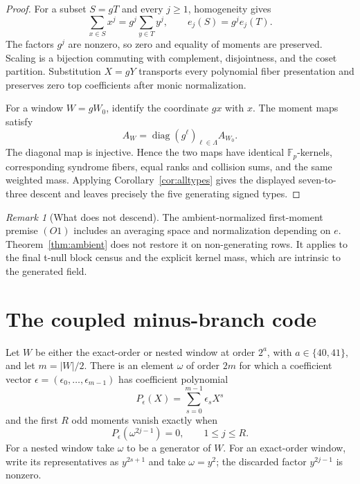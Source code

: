 \documentclass[11pt,a4paper]{amsart}
\theoremstyle{remark}
\newtheorem{remark}[theorem]{Remark}
\newcommand{\F}{\mathbb F}
\begin{document}
\begin{proof}
For a subset \(S=gT\) and every \(j\ge1\), homogeneity gives
\[
 \sum_{x\in S}x^j=g^j\sum_{y\in T}y^j,
 \qquad e_j(S)=g^je_j(T).                             \tag{2.1}
\]
The factors \(g^j\) are nonzero, so zero and equality of moments are
preserved.  Scaling is a bijection commuting with complement, disjointness,
and the coset partition.  Substitution \(X=gY\) transports every polynomial
fiber presentation and preserves zero top coefficients after monic
normalization.

For a window \(W=gW_0\), identify the coordinate \(gx\) with \(x\).  The
moment maps satisfy
\[
 A_W=\operatorname{diag}(g^\ell)_{\ell\in\Lambda}A_{W_0}. \tag{2.2}
\]
The diagonal map is injective.  Hence the two maps have identical
\(\F_p\)-kernels, corresponding syndrome fibers, equal ranks and collision
sums, and the same weighted mass.  Applying
Corollary~\ref{cor:alltypes} gives the displayed seven-to-three descent and
leaves precisely the five generating signed types.
\end{proof}

\begin{remark}[What does not descend]
The ambient-normalized first-moment premise \((O1)\) includes an averaging
space and normalization depending on \(e\).  Theorem~\ref{thm:ambient} does
not restore it on non-generating rows.  It applies to the final t-null block
census and the explicit kernel mass, which are intrinsic to the generated
field.
\end{remark}

\section{The coupled minus-branch code}

Let $W$ be either the exact-order or nested window at order $2^a$, with
$a\in\{40,41\}$, and let $m=|W|/2$.  There is an element $\omega$ of order
$2m$ for which a coefficient vector
$\epsilon=(\epsilon_0,\ldots,\epsilon_{m-1})$ has coefficient polynomial
\[
 P_\epsilon(X)=\sum_{s=0}^{m-1}\epsilon_sX^s
\]
and the first $R$ odd moments vanish exactly when
\[
 P_\epsilon(\omega^{2j-1})=0,
 \qquad 1\le j\le R.                                  \tag{3.1}
\]
For a nested window take $\omega$ to be a generator of $W$.  For an
exact-order window, write its representatives as
$y^{2s+1}$ and take $\omega=y^2$; the discarded factor $y^{2j-1}$ is
nonzero.
\end{document}
